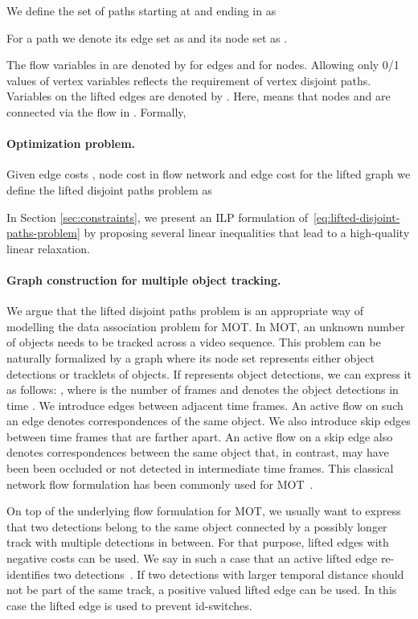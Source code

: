 \documentclass{article}
\begin{document}
We define the set of paths starting at  and ending in  as

For a path  we denote its edge set as  and its node set as .


The flow variables in  are denoted by  for edges and  for nodes. Allowing only 0/1 values of vertex variables reflects the requirement of vertex disjoint paths.
Variables on the lifted edges  are denoted by .
Here,  means that nodes  and  are connected via the flow  in .
Formally, 




\paragraph{Optimization problem.}
Given edge costs , node cost  in flow network  and edge cost  for the lifted graph  we define the lifted disjoint paths problem as



In Section \ref{sec:constraints}, we present an ILP formulation of~\eqref{eq:lifted-disjoint-paths-problem} by proposing
several linear inequalities that lead to a high-quality linear relaxation.

\paragraph{Graph construction for multiple object tracking.}
We argue that the lifted disjoint paths problem is an appropriate way of modelling the data association problem for MOT.
In MOT, an unknown number of objects needs to be tracked across a video sequence.
This problem can be naturally formalized by a graph  where its node set  represents either object detections or tracklets of objects.
If  represents object detections, we can express it as follows: , where  is the number of frames and  denotes the object detections in time .
We introduce edges between adjacent time frames.
An active flow on such an edge denotes correspondences of the same object.
We also introduce skip edges  between time frames that are farther apart.
An active flow on a skip edge also denotes correspondences between the same object that, in contrast, may have been been occluded or not detected in intermediate time frames.
This classical network flow formulation has been commonly used for MOT~\cite{zhang2008global}.

On top of the underlying flow formulation for MOT, we usually want to express that two detections belong to the same object connected by a possibly longer track with multiple detections in between.
For that purpose, lifted edges with negative costs can be used.
We say in such a case that an active lifted edge re-identifies two detections~\cite{tang2017multiple}.
If two detections with larger temporal distance should not be part of the same track, a positive valued lifted edge can be used.
In this case the lifted edge is used to prevent id-switches.
\end{document}
